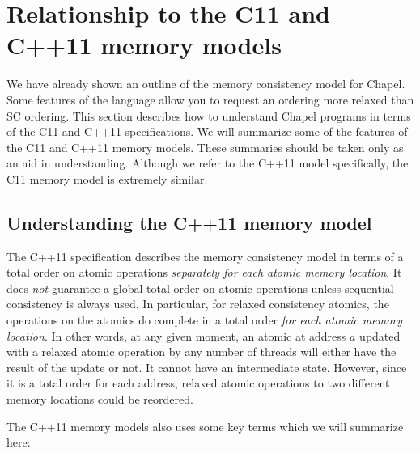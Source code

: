 \section{Relationship to the C11 and C++11 memory models}
\label{relating_to_C_MCM}

We have already shown an outline of the memory consistency model for
Chapel.  Some features of the language allow you to request an ordering
more relaxed than SC ordering. This section describes how to understand
Chapel programs in terms of the C11 and C++11 specifications. We will
summarize some of the features of the C11 and C++11 memory models. These
summaries should be taken only as an aid in understanding. Although we
refer to the C++11 model specifically, the C11 memory model is extremely
similar.

\subsection{Understanding the C++11 memory model}

The C++11 specification describes the memory consistency model in terms of
a total order on atomic operations \textit{separately for each atomic
memory location}. It does \textit{not} guarantee a global total order
on atomic operations unless sequential consistency is always used. In
particular, for relaxed consistency atomics, the operations on the atomics
do complete in a total order \textit{for each atomic memory location}.  In
other words, at any given moment, an atomic at address $a$ updated with a
relaxed atomic operation by any number of threads will either have the
result of the update or not. It cannot have an intermediate state.
However, since it is a total order for each address, relaxed atomic
operations to two different memory locations could be reordered.

The C++11 memory models also uses some key terms which we will summarize here:

